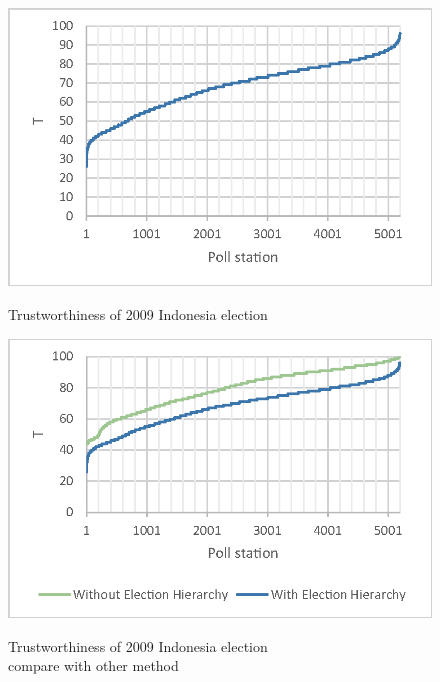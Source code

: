 \documentclass[JIP]{ipsj}
\begin{document}
\begin{figure}[tb]%
\vbox{\it
  \hbox{\includegraphics[scale=0.8]{images/Trustworthiness1.eps}}}
\centerline{}
\caption{Trustworthiness of 2009 Indonesia election}
\label{fig:result1}
\end{figure}

\begin{figure}[tb]%
\vbox{\it
  \hbox{\includegraphics[scale=0.8]{images/Trustworthiness2.eps}}}
\centerline{}
\caption{Trustworthiness of 2009 Indonesia election\\
compare with other method}
\label{fig:result2}
\end{figure}
\end{document}
